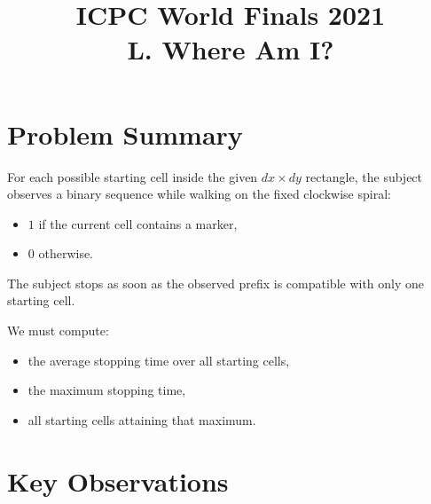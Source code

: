 \documentclass[11pt]{article}
\title{ICPC World Finals 2021\\L. Where Am I?}
\author{}
\date{}
\begin{document}
\maketitle

\section*{Problem Summary}

For each possible starting cell inside the given $dx \times dy$ rectangle, the subject observes a binary
sequence while walking on the fixed clockwise spiral:
\begin{itemize}[leftmargin=*]
    \item $1$ if the current cell contains a marker,
    \item $0$ otherwise.
\end{itemize}

The subject stops as soon as the observed prefix is compatible with only one starting cell.

We must compute:
\begin{itemize}[leftmargin=*]
    \item the average stopping time over all starting cells,
    \item the maximum stopping time,
    \item all starting cells attaining that maximum.
\end{itemize}

\section*{Key Observations}
\end{document}
